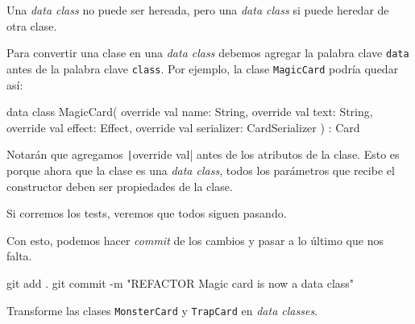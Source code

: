   \begin{important}
    Una \textit{data class} no puede ser hereada, pero una \textit{data class} si puede heredar de
    otra clase.
  \end{important}

  Para convertir una clase en una \textit{data class} debemos agregar la palabra clave
  \texttt{data} antes de la palabra clave \texttt{class}.
  Por ejemplo, la clase \texttt{MagicCard} podría quedar así:

  \begin{kotlin}
    data class MagicCard(
      override val name: String,
      override val text: String,
      override val effect: Effect,
      override val serializer: CardSerializer
    ) : Card
  \end{kotlin}

  Notarán que agregamos \texttt|override val| antes de los atributos de la clase.
  Esto es porque ahora que la clase es una \textit{data class}, todos los parámetros que recibe
  el constructor deben ser propiedades de la clase.

  Si corremos los tests, veremos que todos siguen pasando.

  Con esto, podemos hacer \textit{commit} de los cambios y pasar a lo último que nos falta.

  \begin{powershell}
    git add .
    git commit -m "REFACTOR Magic card is now a data class"
  \end{powershell}

  \begin{exercise}
    Transforme las clases \texttt{MonsterCard} y \texttt{TrapCard} en \textit{data classes}.
  \end{exercise}